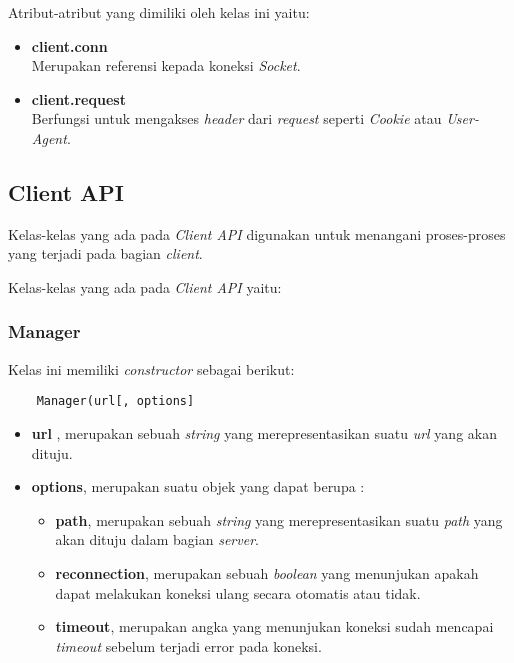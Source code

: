 Atribut-atribut yang dimiliki oleh kelas ini yaitu: 

\begin{itemize}
	\item \textbf{client.conn} \\ Merupakan referensi kepada koneksi \textit{Socket}.
	\item \textbf{client.request} \\ Berfungsi untuk mengakses \textit{header} dari \textit{request} seperti \textit{Cookie} atau \textit{User-Agent}.
\end{itemize}

\subsection{Client API}
Kelas-kelas yang ada pada \textit{Client API} digunakan untuk menangani proses-proses yang terjadi pada bagian \textit{client}. 

Kelas-kelas yang ada pada \textit{Client API} yaitu: 

\subsubsection{Manager}
Kelas ini memiliki \textit{constructor} sebagai berikut: 

\begin{lstlisting}
	Manager(url[, options]
\end{lstlisting}


\begin{itemize}
	\item \textbf{url} , merupakan sebuah \textit{string} yang merepresentasikan suatu \textit{url} yang akan dituju.
	\item \textbf{options}, merupakan suatu objek yang dapat berupa : 
		\begin{itemize}
			\item \textbf{path}, merupakan sebuah \textit{string} yang merepresentasikan suatu \textit{path} yang akan dituju dalam bagian \textit{server}.
			\item \textbf{reconnection}, merupakan sebuah \textit{boolean} yang menunjukan apakah dapat melakukan koneksi ulang secara otomatis atau tidak.
			\item \textbf{timeout}, merupakan angka yang menunjukan koneksi sudah mencapai \textit{timeout} sebelum terjadi error pada koneksi.
		\end{itemize}
\end{itemize}

